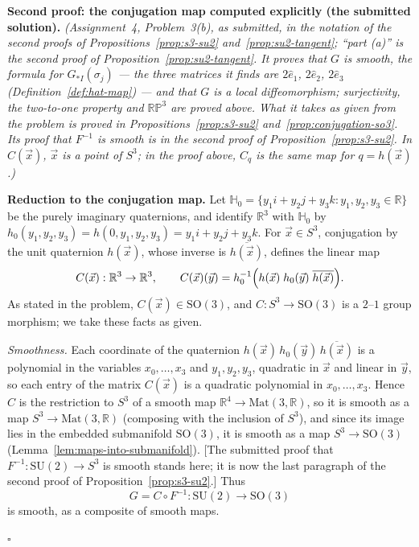 \documentclass[11pt]{report}
\renewenvironment{proof}[1][Proof]{\noindent\textbf{#1.} }{\hfill$\square$\par\vspace{5pt}}
\begin{document}
\begin{proof}[Second proof: the conjugation map computed explicitly (the submitted solution)]
\textit{(Assignment~4, Problem~3(b), as submitted, in the notation of the second proofs of Propositions~\ref{prop:s3-su2} and~\ref{prop:su2-tangent}; ``part (a)'' is the second proof of Proposition~\ref{prop:su2-tangent}. It proves that $G$ is smooth, the formula for $G_{*I}(\sigma_j)$ --- the three matrices it finds are $2\hat e_1$, $2\hat e_2$, $2\hat e_3$ (Definition~\ref{def:hat-map}) --- and that $G$ is a local diffeomorphism; surjectivity, the two-to-one property and $\mathbb{RP}^3$ are proved above. What it takes as given from the problem is proved in Propositions~\ref{prop:s3-su2} and~\ref{prop:conjugation-so3}. Its proof that $F^{-1}$ is smooth is in the second proof of Proposition~\ref{prop:s3-su2}. In $C(\vec x)$, $\vec x$ is a point of $S^3$; in the proof above, $C_q$ is the same map for $q = h(\vec x)$.)}

\textbf{Reduction to the conjugation map.} Let $\mathbb{H}_0 = \{ y_1 i + y_2 j + y_3 k : y_1, y_2, y_3 \in \mathbb{R} \}$ be the purely imaginary quaternions, and identify $\mathbb{R}^3$ with $\mathbb{H}_0$ by $h_0(y_1, y_2, y_3) = h(0, y_1, y_2, y_3) = y_1 i + y_2 j + y_3 k$. For $\vec x \in S^3$, conjugation by the unit quaternion $h(\vec x)$, whose inverse is $\overline{h(\vec x)}$, defines the linear map
\[
C(\vec x) : \mathbb{R}^3 \to \mathbb{R}^3, \qquad C(\vec x)(\vec y) = h_0^{-1}\Bigl( h(\vec x)\; h_0(\vec y)\; \overline{h(\vec x)} \Bigr).
\]
As stated in the problem, $C(\vec x) \in \mathrm{SO}(3)$, and $C : S^3 \to \mathrm{SO}(3)$ is a $2$--$1$ group morphism; we take these facts as given.

\emph{Smoothness.} Each coordinate of the quaternion $h(\vec x)\, h_0(\vec y)\, \overline{h(\vec x)}$ is a polynomial in the variables $x_0, \ldots, x_3$ and $y_1, y_2, y_3$, quadratic in $\vec x$ and linear in $\vec y$, so each entry of the matrix $C(\vec x)$ is a quadratic polynomial in $x_0, \ldots, x_3$. Hence $C$ is the restriction to $S^3$ of a smooth map $\mathbb{R}^4 \to \mathrm{Mat}(3, \mathbb{R})$, so it is smooth as a map $S^3 \to \mathrm{Mat}(3, \mathbb{R})$ (composing with the inclusion of $S^3$), and since its image lies in the embedded submanifold $\mathrm{SO}(3)$, it is smooth as a map $S^3 \to \mathrm{SO}(3)$ (Lemma~\ref{lem:maps-into-submanifold}). [The submitted proof that $F^{-1} : \mathrm{SU}(2) \to S^3$ is smooth stands here; it is now the last paragraph of the second proof of Proposition~\ref{prop:s3-su2}.] Thus
\[
G = C \circ F^{-1} : \mathrm{SU}(2) \to \mathrm{SO}(3)
\]
is smooth, as a composite of smooth maps.


\end{proof}
\end{document}
